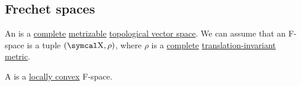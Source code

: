 \subsection{Frechet spaces}\label{subsec:frechet_spaces}

\begin{definition}\label{def:frechet_space}
  An  is a \hyperref[thm:uniform_space_completion]{complete} \hyperref[def:metric_topology]{metrizable} \hyperref[def:topological_vector_space]{topological vector space}. We can assume that an F-space is a tuple \( (\CX, \rho) \), where \( \rho \) is a \hyperref[def:complete_metric_space]{complete} \hyperref[def:translation_invariant_metric]{translation-invariant} \hyperref[def:metric_space]{metric}.

  A  is a \hyperref[def:locally_convex_space]{locally convex} F-space.
\end{definition}
